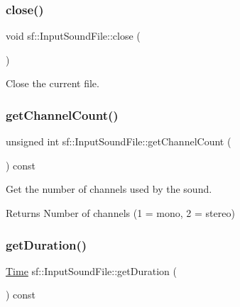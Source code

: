 \subsubsection{\texorpdfstring{close()}{close()}}
{\footnotesize\ttfamily void sf\+::\+Input\+Sound\+File\+::close (\begin{DoxyParamCaption}{ }\end{DoxyParamCaption})\hspace{0.3cm}{\ttfamily [private]}}



Close the current file. 

\begin{DoxyVerb}\end{DoxyVerb}
 \mbox{\label{classsf_1_1_input_sound_file_a54307c308ba05dea63aba54a29c804a4}} 
\subsubsection{\texorpdfstring{getChannelCount()}{getChannelCount()}}
{\footnotesize\ttfamily unsigned int sf\+::\+Input\+Sound\+File\+::get\+Channel\+Count (\begin{DoxyParamCaption}{ }\end{DoxyParamCaption}) const}



Get the number of channels used by the sound. 

\begin{DoxyReturn}{Returns}
Number of channels (1 = mono, 2 = stereo) \begin{DoxyVerb}\end{DoxyVerb}
 
\end{DoxyReturn}
\mbox{\label{classsf_1_1_input_sound_file_aa081bd4d9732408d10b48227a360778e}} 
\subsubsection{\texorpdfstring{getDuration()}{getDuration()}}
{\footnotesize\ttfamily \mbox{\hyperlink{classsf_1_1_time}{Time}} sf\+::\+Input\+Sound\+File\+::get\+Duration (\begin{DoxyParamCaption}{ }\end{DoxyParamCaption}) const}



